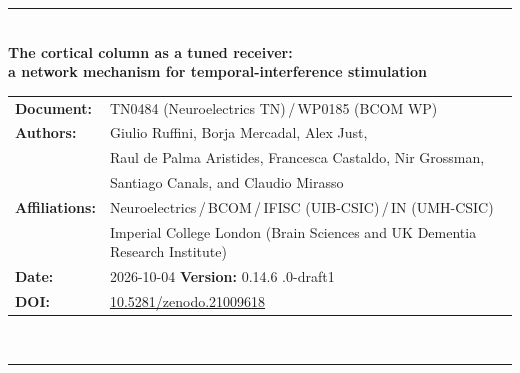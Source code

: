 \documentclass[11pt,a4paper]{article}
\newif\ifsupp
\newcommand{\paperver}{0.15.0-draft1} %
\providecommand{\DIFaddtex}[1]{{\protect\color{blue} \sf #1}} %
\providecommand{\DIFdeltex}[1]{{\protect\color{red} \scriptsize #1}} %
\providecommand{\DIFaddbegin}{} %
\providecommand{\DIFaddend}{} %
\providecommand{\DIFdelbegin}{} %
\providecommand{\DIFdelend}{} %
\providecommand{\DIFadd}[1]{\texorpdfstring{\DIFaddtex{#1}}{#1}} %
\providecommand{\DIFdel}[1]{\texorpdfstring{\DIFdeltex{#1}}{}} %
\begin{document}
\vspace{6pt}
\else
\begin{flushleft}
{\color{neblue}\rule{\textwidth}{2pt}}\\[4pt]
{\LARGE\bfseries The cortical column as a tuned receiver:\\[2pt]
a network mechanism for temporal-interference stimulation}\\[10pt]
\begin{tabular}{@{}ll@{}}
\textbf{Document:} & TN0484 (Neuroelectrics TN)\,/\,WP0185 (BCOM WP) \\
\textbf{Authors:} & Giulio Ruffini, Borja Mercadal, Alex Just,\\
& Raul de Palma Aristides, Francesca Castaldo, Nir Grossman,\\
& Santiago Canals, and Claudio Mirasso \\
\textbf{Affiliations:} & Neuroelectrics\,/\,BCOM\,/\,IFISC (UIB-CSIC)\,/\,IN (UMH-CSIC)\\
& Imperial College London (Brain Sciences and UK Dementia Research Institute) \\
\textbf{Date:} & 2026-10-04 \qquad \textbf{Version:} \DIFdelbegin \DIFdel{0.14.6 }\DIFdelend \DIFaddbegin \DIFadd{\paperver }\DIFaddend \\
\textbf{DOI:} & \href{https://doi.org/10.5281/zenodo.21009618}{10.5281/zenodo.21009618} \\
\end{tabular}\\[4pt]
{\color{neblue}\rule{\textwidth}{1pt}}
\end{flushleft}
\fi

\ifsupp
\begin{center}
{\large\bfseries Supplementary Material}\\[4pt]
\begin{minipage}{0.86\textwidth}\centering\small
Appendices and supplementary figures accompanying the article. Section, equation and
figure numbers referenced here follow the main text; supplementary figures are numbered
S1, S2, \dots
\end{minipage}
\end{center}
\vspace{8pt}
\fi

\ifsupp\else
\end{document}
